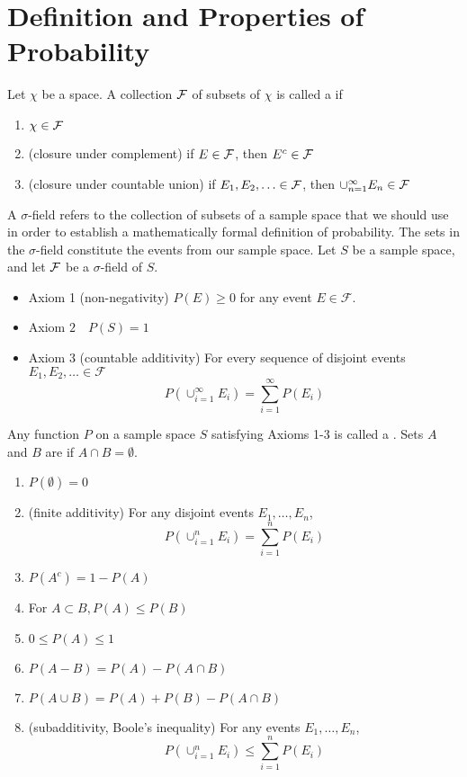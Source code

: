 \documentclass[11pt]{article}
\begin{document}
   \section{Definition and Properties of Probability}
   Let $\chi$ be a space. A collection $\mathcal{F}$ of subsets of $\chi$ is called a  if
   \begin{enumerate}
   	\item $\chi \in \mathcal{F}$
   	\item (closure under complement) if $E \in \mathcal{F}$, then $E^c \in \mathcal{F}$
   	\item (closure under countable union) if $E_1, E_2, \hdots \in \mathcal{F}$, then $\cup_{n=1}^\infty E_n \in \mathcal{F}$
   \end{enumerate}
   \remark A $\sigma$-field refers to the collection of subsets of a sample space that we should use in order to establish a mathematically formal definition of probability. The sets in the $\sigma$-field constitute the events from our sample space.
   Let $S$ be a sample space, and let $\mathcal{F}$ be a $\sigma$-field of $S$.
   \begin{itemize}
   	\item Axiom 1 (non-negativity) \(P(E) \geq 0\) for any event \(E \in \mathcal{F}\).
   	\item Axiom \(2 \quad P(S)=1\)
   	\item Axiom 3 (countable additivity) For every sequence of disjoint events \(E_{1}, E_{2}, \ldots \in \mathcal{F}\)
$$
P\left(\cup_{i=1}^\infty E_{i}\right)=\sum_{i=1}^{\infty} P\left(E_{i}\right)
$$
   \end{itemize}
    Any function $P$ on a sample space $S$ satisfying Axioms 1-3 is called a .
    Sets $A$ and $B$ are  if $A \cap B = \emptyset$.
   \begin{enumerate}
   	\item $P(\emptyset) = 0$
   	\item (finite additivity) For any disjoint events $E_1, \hdots, E_n$, $$P(\cup_{i=1}^n E_i) = \sum_{i=1}^n P(E_i)$$
   	\item $P(A^c) = 1 - P(A)$
   	\item For $A \subset B, P(A) \leq P(B)$
   	\item $0 \leq P(A) \leq 1$
   	\item $P(A- B) = P(A) - P(A \cap B)$
   	\item $P(A\cup B) = P(A) + P(B) - P(A \cap B)$
   	\item (subadditivity, Boole's inequality) For any events $E_1, \hdots, E_n$,
   	$$P(\cup_{i=1}^n E_i) \leq \sum_{i=1}^n P(E_i)$$
   \end{enumerate}
\end{document}
